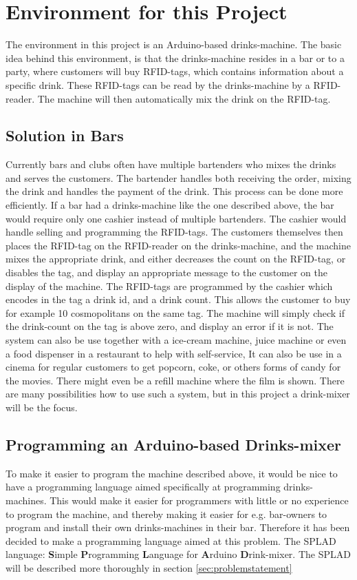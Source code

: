 \section{Environment for this Project}
The environment in this project is an Arduino-based drinks-machine. The basic idea behind this environment, is that the drinks-machine resides in a bar or to a party, where customers will buy RFID-tags, which contains information about a specific drink. These RFID-tags can be read by the drinks-machine by a RFID-reader. The machine will then automatically mix the drink on the RFID-tag.

\subsection{Solution in Bars}
Currently bars and clubs often have multiple bartenders who mixes the drinks and serves the customers. The bartender handles both receiving the order, mixing the drink and handles the payment of the drink. This process can be done more efficiently. If a bar had a drinks-machine like the one described above, the bar would require only one cashier instead of multiple bartenders. The cashier would handle selling and programming the RFID-tags. The customers themselves then places the RFID-tag on the RFID-reader on the drinks-machine, and the machine mixes the appropriate drink, and either decreases the count on the RFID-tag, or disables the tag, and display an appropriate message to the customer on the display of the machine. The RFID-tags are programmed by the cashier which encodes in the tag a drink id, and a drink count. This allows the customer to buy for example 10 cosmopolitans on the same tag. The machine will simply check if the drink-count on the tag is above zero, and display an error if it is not.
The system can also be use together with a ice-cream machine, juice machine or even a food dispenser in a restaurant to help with self-service, It can also be use in a cinema for regular customers to get popcorn, coke, or others forms of candy for the movies. There might even be a refill machine where the film is shown. There are many possibilities how to use such a system, but in this project a drink-mixer will be the focus.
\subsection{Programming an Arduino-based Drinks-mixer}
To make it easier to program the machine described above, it would be nice to have a programming language aimed specifically at programming drinks-machines. This would make it easier for programmers with little or no experience to program the machine, and thereby making it easier for e.g. bar-owners to program and install their own drinks-machines in their bar. Therefore it has been decided to make a programming language aimed at this problem. The SPLAD language: \textbf{S}imple \textbf{P}rogramming \textbf{L}anguage for \textbf{A}rduino \textbf{D}rink-mixer. The SPLAD will be described more thoroughly in section \ref{sec:problemstatement}